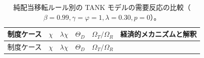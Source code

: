 \documentclass[
  japanese,
  lualatex,
  ja=standard,
  12pt,
  a4paper]{ltjsarticle}
\begin{document}
\begin{longtable}[]{@{}
  >{\raggedleft\arraybackslash}p{}
  >{\raggedleft\arraybackslash}p{}
  >{\raggedleft\arraybackslash}p{}
  >{\raggedleft\arraybackslash}p{}
  >{\raggedleft\arraybackslash}p{}
  >{\raggedright\arraybackslash}p{}@{}}
\caption{純配当移転ルール別の TANK
モデルの需要反応の比較（\(\beta=0.99, \gamma=\varphi=1, \lambda=0.30, p=0\)）。}\label{tbl-lecture12-numerical-cases}\tabularnewline
\toprule\noalign{}
\begin{minipage}[b]{\linewidth}\raggedleft
制度ケース
\end{minipage} & \begin{minipage}[b]{\linewidth}\raggedleft
\(\chi\)
\end{minipage} & \begin{minipage}[b]{\linewidth}\raggedleft
\(\lambda\chi\)
\end{minipage} & \begin{minipage}[b]{\linewidth}\raggedleft
\(\Theta_D\)
\end{minipage} & \begin{minipage}[b]{\linewidth}\raggedleft
\(\Omega_T / \Omega_R\)
\end{minipage} & \begin{minipage}[b]{\linewidth}\raggedright
経済的メカニズムと解釈
\end{minipage} \\
\midrule\noalign{}
\endfirsthead
\toprule\noalign{}
\begin{minipage}[b]{\linewidth}\raggedleft
制度ケース
\end{minipage} & \begin{minipage}[b]{\linewidth}\raggedleft
\(\chi\)
\end{minipage} & \begin{minipage}[b]{\linewidth}\raggedleft
\(\lambda\chi\)
\end{minipage} & \begin{minipage}[b]{\linewidth}\raggedleft
\(\Theta_D\)
\end{minipage} & \begin{minipage}[b]{\linewidth}\raggedleft
\(\Omega_T / \Omega_R\)
\end{minipage} & \begin{minipage}[b]{\linewidth}\raggedright

\end{minipage}
\end{longtable}
\end{document}

